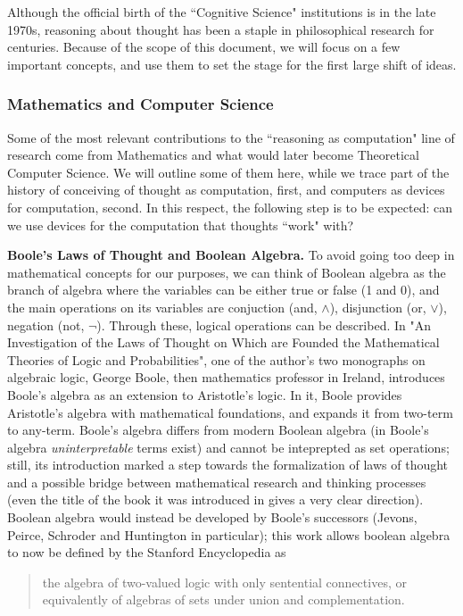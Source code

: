 \documentclass[../main.tex]{subfiles}
\begin{document}
Although the official birth of the ``Cognitive Science" institutions is in the late 1970s, reasoning about thought has been a staple in philosophical research for centuries. Because of the scope of this document, we will focus on a few important concepts, and use them to set the stage for the first large shift of ideas.

\subsubsection{Mathematics and Computer Science}
Some of the most relevant contributions to the ``reasoning as computation" line of research come from Mathematics and what would later become Theoretical Computer Science. We will outline some of them here, while we trace part of the history of conceiving of thought as computation, first, and computers as devices for computation, second. In this respect, the following step is to be expected: can we use devices for the computation that thoughts ``work" with?

\textbf{Boole's Laws of Thought and Boolean Algebra.} To avoid going too deep in mathematical concepts for our purposes, we can think of Boolean algebra as the branch of algebra where the variables can be either true or false (1 and 0), and the main operations on its variables are conjuction (and, $\wedge$), disjunction (or, $\vee$), negation (not, $\neg$). Through these, logical operations can be described.
In "An Investigation of the Laws of Thought on Which are Founded the Mathematical Theories of Logic and Probabilities", one of the author's two monographs on algebraic logic, George Boole, then mathematics professor in Ireland, introduces Boole's algebra as an extension to Aristotle's logic. In it, Boole provides Aristotle's algebra with mathematical foundations, and expands it from two-term to any-term. Boole's algebra differs from modern Boolean algebra (in Boole's algebra \textit{uninterpretable} terms exist) and cannot be inteprepted as set operations; still, its introduction marked a step towards the formalization of laws of thought and a possible bridge between mathematical research and thinking processes (even the title of the book it was introduced in gives a very clear direction). Boolean algebra would instead be developed by Boole's successors (Jevons, Peirce, Schroder and Huntington in particular); this work allows boolean algebra to now be defined by the Stanford Encyclopedia as
\begin{quote}
    the algebra of two-valued logic with only sentential connectives, or equivalently of algebras of sets under union and complementation.
\end{quote}
\end{document}
